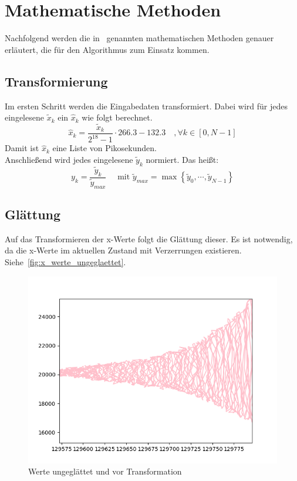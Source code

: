 \protect\pagebreak

\section{Mathematische Methoden}\label{sec:mathematische-methoden}
Nachfolgend werden die in~ genannten mathematischen Methoden genauer erläutert, die für den Algorithmus zum Einsatz kommen.

\subsection{Transformierung}\label{subsec:transformierung}
Im ersten Schritt werden die Eingabedaten transformiert.
Dabei wird für jedes eingelesene $\tilde{x}_k \text{ ein } \hat{x}_k$ wie folgt berechnet.
\begin{equation}
    \hat{x}_{k}=\frac{\tilde{x}_{k}}{2^{18}-1} \cdot 266.3-132.3 \quad, \forall k \in[0, N-1]\label{eq:transformation}
\end{equation}
Damit ist $\hat{x}_k$ eine Liste von Pikosekunden.\\
Anschließend wird jedes eingelesene $\tilde{y}_k$ normiert.
Das heißt:
\begin{equation}
    y_k=\frac{\tilde{y}_k}{\tilde{y}_{max}} \quad \text{ mit } \tilde{y}_{max}=\max{\left\{ \tilde{y}_0, \cdots,\tilde{y}_{N-1}\right\}}\label{eq:y_norm}
\end{equation}

\subsection{Glättung}\label{subsec:gleattung}
Auf das Transformieren der x-Werte folgt die Glättung dieser.
Es ist notwendig, da die x-Werte im aktuellen Zustand mit Verzerrungen existieren.
Siehe~\autoref{fig:x_werte_ungeglaettet}.

\begin{figure}[htb]
    \centering
    \includegraphics[scale=0.62]{images/Werte_unglatt}
    \caption{Werte ungeglättet und vor Transformation}
    \label{fig:x_werte_ungeglaettet}
\end{figure}

